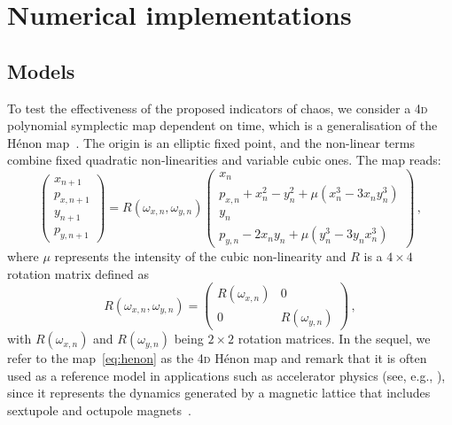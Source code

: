 %
\section{\label{sec:dyn:numerical_implementations} Numerical implementations}
%
\subsection{Models}
%
To test the effectiveness of the proposed indicators of chaos, we consider a 4\textsc{d} polynomial symplectic map dependent on time, which is a generalisation of the Hénon map~\cite{Bazzani:262179}. The origin is an elliptic fixed point, and the non-linear terms combine fixed quadratic non-linearities and variable cubic ones. The map reads:
\begin{equation}
    \left(\begin{array}{c}
    x_{n+1} \\
    p_{x, n+1} \\
    y_{n+1} \\
    p_{y, n+1}
    \end{array}\right) =R(\omega_{x,n}, \omega_{y, n}) \left(\begin{array}{c}
    x_{n} \\
    p_{x, n}+x_{n}^{2}-y_{n}^{2} + \mu \left(x_{n}^{3} - 3x_{n}y_{n}^{3}\right) \\
    y_{n} \\
    p_{y, n}-2 x_{n} y_{n} + \mu \left(y_{n}^{3} - 3y_{n} x_{n}^{3}\right)
    \end{array}\right) \,,
    \label{eq:henon}
\end{equation}
where $\mu$ represents the intensity of the cubic non-linearity and $R$ is a $4\times 4$ rotation matrix defined as
\begin{equation}
    R(\omega_{x,n}, \omega_{y, n})=\left(\begin{array}{cc}
    R\left(\omega_{x, n}\right) & 0 \\
    0 & R\left(\omega_{y, n}\right)
    \end{array}\right) \,,
\end{equation}
with $R\left(\omega_{x, n}\right)$ and $R\left(\omega_{y, n}\right)$ being $2\times 2$ rotation matrices. In the sequel, we refer to the map~\eqref{eq:henon} as the 4\textsc{d} Hénon map and remark that it is often used as a reference model in applications such as accelerator physics (see, e.g., \cite{Bazzani:262179, invlog, Bazzani:2019csk}), since it represents the dynamics generated by a magnetic lattice that includes sextupole and octupole magnets~\cite{Bazzani:262179}.

